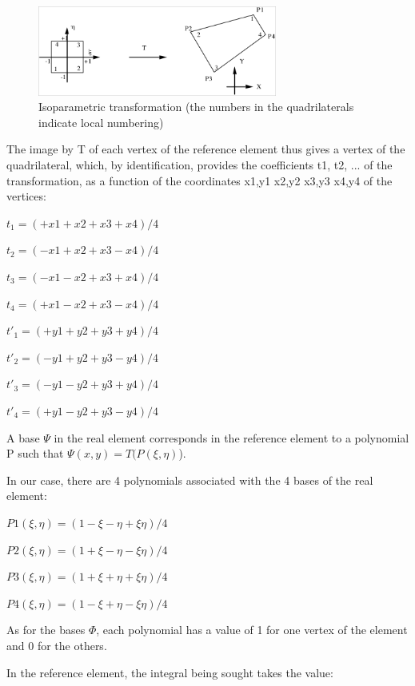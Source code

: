 \begin{figure}[H]%
\begin{center}
%
  \includegraphics[width=0.7\textwidth]{./graphics/isoparametric}
%
\end{center}
\caption{Isoparametric transformation (the numbers in the quadrilaterals
indicate local numbering)}
\label{fig:isoparametric}
\end{figure}

The image by T of each vertex of the reference element thus gives a vertex of
the quadrilateral, which, by identification, provides the coefficients t1, t2,
... of the transformation, as a function of the coordinates x1,y1    x2,y2
x3,y3    x4,y4    of the vertices:

$t_{1} = ( +x1 + x2 + x3 + x4 ) / 4$

$t_{2} = ( -x1 + x2 + x3 - x4 ) / 4$

$t_{3} = ( -x1 - x2 + x3 + x4 ) / 4$

$t_{4} = ( +x1 - x2 + x3 - x4 ) / 4$

$t'_{1} = ( +y1 + y2 + y3 + y4 ) / 4$

$t'_{2} = ( -y1 + y2 + y3 - y4 ) / 4$

$t'_{3} = ( -y1 - y2 + y3 + y4 ) / 4$

$t'_{4} = ( +y1 - y2 + y3 - y4 ) / 4$

A base $\Psi$ in the real element corresponds in the reference element to a
polynomial P such that $\Psi(x,y)  =  T(P(\xi,\eta)$).

In our case, there are 4 polynomials associated with the 4 bases of the real element:

$P1(\xi,\eta) = ( 1 - \xi- \eta + \xi\eta)/4$

$P2(\xi,\eta) = ( 1 + \xi- \eta - \xi\eta)/4$

$P3(\xi,\eta) = ( 1 + \xi+ \eta + \xi\eta)/4$

$P4(\xi,\eta) = ( 1 - \xi+ \eta - \xi\eta)/4$

As for the bases $\Phi$, each polynomial has a value of 1 for one vertex of the
element and 0 for the others.

In the reference element, the integral being sought takes the value:


